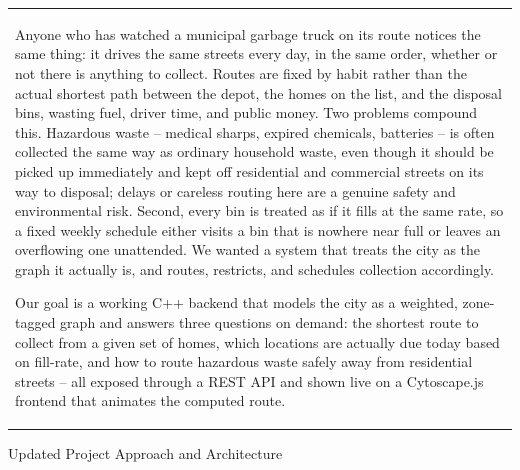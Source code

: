 \documentclass[12pt,a4paper]{article}
\newcommand{\sectiontitle}[1]{%
    {\color{GEUBlue}
    \fontsize{18}{22}\selectfont #1}
}
\newcommand{\answerbox}[2]{%
    \begin{tabularx}{\textwidth}{
        |>{\raggedright\arraybackslash}X|}
        \hline
        \parbox[t][#1][t]{\dimexpr\linewidth-12pt\relax}{
            \vspace{5pt}
            \fontsize{11}{13.5}\selectfont
            \setlength{\parskip}{4pt}
            #2
        }\\
        \hline
    \end{tabularx}
}
\begin{document}
\answerbox{7.2cm}{Anyone who has watched a municipal garbage truck on its route notices the same thing: it drives the same streets every day, in the same order, whether or not there is anything to collect. Routes are fixed by habit rather than the actual shortest path between the depot, the homes on the list, and the disposal bins, wasting fuel, driver time, and public money. Two problems compound this. Hazardous waste -- medical sharps, expired chemicals, batteries -- is often collected the same way as ordinary household waste, even though it should be picked up immediately and kept off residential and commercial streets on its way to disposal; delays or careless routing here are a genuine safety and environmental risk. Second, every bin is treated as if it fills at the same rate, so a fixed weekly schedule either visits a bin that is nowhere near full or leaves an overflowing one unattended. We wanted a system that treats the city as the graph it actually is, and routes, restricts, and schedules collection accordingly.

Our goal is a working C++ backend that models the city as a weighted, zone-tagged graph and answers three questions on demand: the shortest route to collect from a given set of homes, which locations are actually due today based on fill-rate, and how to route hazardous waste safely away from residential streets -- all exposed through a REST API and shown live on a Cytoscape.js frontend that animates the computed route.}

\newpage

\sectiontitle{Updated Project Approach and Architecture}

\vspace{0.05cm}


\vspace{0.25cm}
\end{document}

